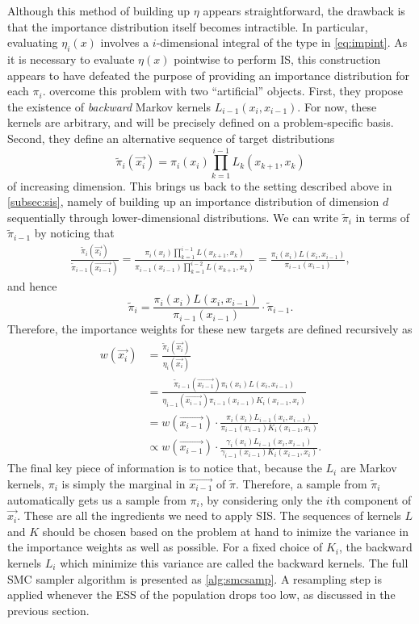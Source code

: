 Although this method of building up $\eta$ appears straightforward, the
drawback is that the importance distribution itself becomes intractible. In
particular, evaluating $\eta_i(x)$ involves a $i$-dimensional integral of the
type in \cref{eq:impint}. As it is necessary to evaluate $\eta(x)$ pointwise to
perform \gls{IS}, this construction appears to have defeated the purpose of
providing an importance distribution for each $\pi_i$.
\textcite{del2006sequential} overcome this problem with two ``artificial''
objects. First, they propose the existence of \textit{backward} Markov kernels
$L_{i-1}(x_i, x_{i-1})$. For now, these kernels are arbitrary, and will be
precisely defined on a problem-specific basis. Second, they define an
alternative sequence of target distributions
\[
  \tilde{\pi}_i(\vec{x_i}) = \pi_i(x_i) \prod_{k=1}^{i-1} L_k(x_{k+1}, x_k)
\]
of increasing dimension. This brings us back to the setting described above in
\cref{subsec:sis}, namely of building up an importance distribution of
dimension $d$ sequentially through lower-dimensional distributions. We can
write $\tilde{\pi}_i$ in terms of $\tilde{\pi}_{i-1}$ by noticing that
\begin{align*}
  \frac{\tilde{\pi}_i(\vec{x_i})}{\tilde{\pi}_{i-1}(\vec{x_{i-1}})} 
  = \frac{\pi_i(x_i) \prod_{k=1}^{i-1} L(x_{k+1}, x_k)}
  {\pi_{i-1}(x_{i-1}) \prod_{k=1}^{i-2} L(x_{k+1}, x_k)}
  = \frac{\pi_i(x_i) L(x_i, x_{i-1})}{\pi_{i-1}(x_{i-1})},
\end{align*}
and hence
\[
  \tilde{\pi}_i = \frac{\pi_i(x_i) L(x_i, x_{i-1})}{\pi_{i-1}(x_{i-1})} \cdot \tilde{\pi}_{i-1}.
\]
Therefore, the importance weights for these new targets are defined recursively as
\begin{align}
  w(\vec{x_i}) 
    &= \frac{\tilde{\pi}_i(\vec{x_i})}{\eta_i(\vec{x_i})} \\
    &= \frac{\tilde{\pi}_{i-1}(\vec{x_{i-1}}) \pi_i(x_i) L(x_i, x_{i-1})}
           {\eta_{i-1}(\vec{x_{i-1}}) \pi_{i-1}(x_{i-1}) K_i(x_{i-1}, x_i)} \\
    &= w(\vec{x_{i-1}}) \cdot
      \frac{\pi_i(x_i) L_{i-1}(x_i, x_{i-1})}
           {\pi_{i-1}(x_{i-1}) K_i(x_{i-1}, x_i)} \\
    &\propto w(\vec{x_{i-1}}) \cdot
      \frac{\gamma_i(x_i) L_{i-1}(x_i, x_{i-1})}
           {\gamma_{i-1}(x_{i-1}) K_i(x_{i-1}, x_i)}.
    \label{eq:smcwt}
\end{align}
The final key piece of information is to notice that, because the $L_i$ are
Markov kernels, $\pi_i$ is simply the marginal in $\vec{x_{i-1}}$ of
$\tilde{\pi}$. Therefore, a sample from $\tilde{\pi}_i$ automatically gets us a
sample from $\pi_i$, by considering only the $i$th component of $\vec{x_i}$.
These are all the ingredients we need to apply \gls{SIS}. The sequences of
kernels $L$ and $K$ should be chosen based on the problem at hand to inimize
the variance in the importance weights as well as possible. For a fixed choice
of $K_i$, the backward kernels $L_i$ which minimize this variance are called
the  backward kernels. The full \gls{SMC} sampler algorithm is
presented as \cref{alg:smcsamp}. A resampling step is applied whenever the
\gls{ESS} of the population drops too low, as discussed in the previous
section.

